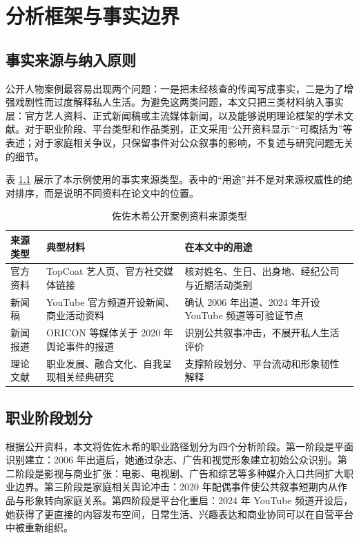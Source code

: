 \chapter{分析框架与事实边界}

\section{事实来源与纳入原则}

公开人物案例最容易出现两个问题：一是把未经核查的传闻写成事实，二是为了增强戏剧性而过度解释私人生活。为避免这两类问题，本文只把三类材料纳入事实层：官方艺人资料、正式新闻稿或主流媒体新闻，以及能够说明理论框架的学术文献。对于职业阶段、平台类型和作品类别，正文采用“公开资料显示”“可概括为”等表述；对于家庭相关争议，只保留事件对公众叙事的影响，不复述与研究问题无关的细节。

表 \ref{tab:nwu-sasaki-source} 展示了本示例使用的事实来源类型。表中的“用途”并不是对来源权威性的绝对排序，而是说明不同资料在论文中的位置。

\begin{table}[htbp]
  \centering
  \caption{佐佐木希公开案例资料来源类型}
  \label{tab:nwu-sasaki-source}
  \begin{tabularx}{0.94\textwidth}{@{}p{3.2cm}XX@{}}
    \toprule
    来源类型 & 典型材料 & 在本文中的用途\\
    \midrule
    官方资料 & TopCoat 艺人页、官方社交媒体链接 & 核对姓名、生日、出身地、经纪公司与近期活动类别\\
    新闻稿 & YouTube 官方频道开设新闻、商业活动资料 & 确认 2006 年出道、2024 年开设 YouTube 频道等可验证节点\\
    新闻报道 & ORICON 等媒体关于 2020 年舆论事件的报道 & 识别公共叙事冲击，不展开私人生活评价\\
    理论文献 & 职业发展、融合文化、自我呈现相关经典研究 & 支撑阶段划分、平台流动和形象韧性解释\\
    \bottomrule
  \end{tabularx}
\end{table}

\section{职业阶段划分}

根据公开资料，本文将佐佐木希的职业路径划分为四个分析阶段。第一阶段是平面识别建立：2006 年出道后，她通过杂志、广告和视觉形象建立初始公众识别。第二阶段是影视与商业扩张：电影、电视剧、广告和综艺等多种媒介入口共同扩大职业边界。第三阶段是家庭相关舆论冲击：2020 年配偶事件使公共叙事短期内从作品与形象转向家庭关系。第四阶段是平台化重启：2024 年 YouTube 频道开设后，她获得了更直接的内容发布空间，日常生活、兴趣表达和商业协同可以在自营平台中被重新组织。

